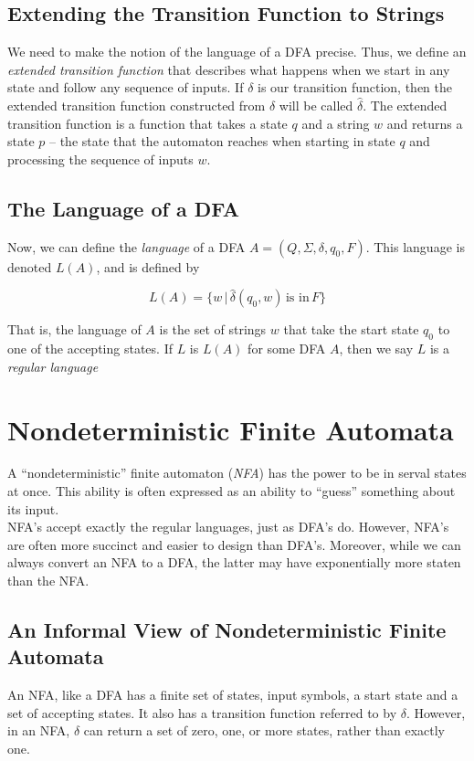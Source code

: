 \documentclass[]{article}
\begin{document}
  \subsection*{Extending the Transition Function to Strings}
    We need to make the notion of the language of a DFA precise. Thus, we
    define an \emph{extended transition function} that describes what happens
    when we start in any state and follow any sequence of inputs. If $\delta$
    is our transition function, then the extended transition function
    constructed from $\delta$ will be called $\hat{\delta}$. The extended
    transition function is a function that takes a state $q$ and a string $w$
    and returns a state $p$ -- the state that the automaton reaches when
    starting in state $q$ and processing the sequence of inputs $w$.

  \subsection*{The Language of a DFA}
    Now, we can define the \emph{language} of a DFA $A = (Q, \Sigma, \delta,
    q_0, F)$. This language is denoted $L(A)$, and is defined by

      \[ L(A) = \{w\, | \, \hat{\delta}(q_0, w) \, \text{is in} \, F\} \]

    That is, the language of $A$ is the set of strings $w$ that take the start
    state $q_0$ to one of the accepting states. If $L$ is $L(A)$ for some DFA
    $A$, then we say $L$ is a \emph{regular language}

\section*{Nondeterministic Finite Automata}
  A ``nondeterministic'' finite automaton (\emph{NFA}) has the power to be in
  serval states at once. This ability is often expressed as an ability to
  ``guess'' something about its input. \\
  \indent NFA's accept exactly the regular languages, just as DFA's do.
  However, NFA's are often more succinct and easier to design than DFA's.
  Moreover, while we can always convert an NFA to a DFA, the latter may have
  exponentially more staten than the NFA.

  \subsection*{An Informal View of Nondeterministic Finite Automata}
    An NFA, like a DFA has a finite set of states, input symbols, a start
    state and a set of accepting states. It also has a transition function
    referred to by $\delta$. However, in an NFA, $\delta$ can return a set of
    zero, one, or more states, rather than exactly one.
\end{document}

